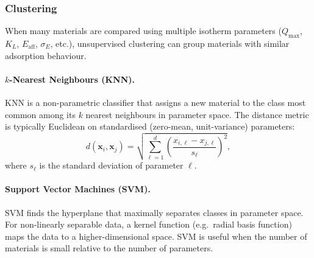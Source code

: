 \documentclass[12pt]{article}
\begin{document}
	\subsubsection{Clustering}

	When many materials are compared using multiple isotherm parameters
	($Q_{\max}$, $K_L$, $E_{\mathrm{aff}}$, $\sigma_E$, etc.),
	unsupervised clustering can group materials with similar adsorption
	behaviour.

	\paragraph{$k$-Nearest Neighbours (KNN).}
	KNN is a non-parametric classifier that assigns a new material to
	the class most common among its $k$ nearest neighbours in
	parameter space. The distance metric is typically Euclidean on
	standardised (zero-mean, unit-variance) parameters:
	\begin{equation}
		d(\mathbf{x}_i, \mathbf{x}_j)
		= \sqrt{\sum_{\ell=1}^{d}
			\left(\frac{x_{i,\ell} - x_{j,\ell}}{s_\ell}\right)^{\!2}},
	\end{equation}
	where $s_\ell$ is the standard deviation of parameter $\ell$.

	\paragraph{Support Vector Machines (SVM).}
	SVM finds the hyperplane that maximally separates classes in
	parameter space. For non-linearly separable data, a kernel
	function (e.g.\ radial basis function) maps the data to a
	higher-dimensional space. SVM is useful when the number of
	materials is small relative to the number of parameters.
	
	
	
\end{document}
